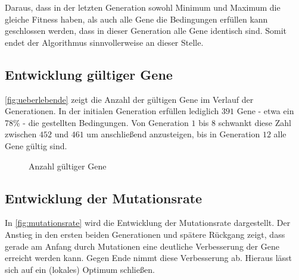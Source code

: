 Daraus, dass in der letzten Generation sowohl Minimum und Maximum die gleiche Fitness haben,
als auch alle Gene die Bedingungen erfüllen kann geschlossen werden, dass in dieser Generation alle Gene identisch sind.
Somit endet der Algorithmus sinnvollerweise an dieser Stelle.

\subsection{Entwicklung gültiger Gene}

\autoref{fig:ueberlebende} zeigt die Anzahl der gültigen Gene im Verlauf der Generationen.
In der initialen Generation erfüllen lediglich $391$ Gene - etwa ein 78\% - die gestellten Bedingungen.
Von Generation $1$ bis $8$ schwankt diese Zahl zwischen $452$ und $461$ um anschließend anzusteigen,
 bis in Generation $12$ alle Gene gültig sind.

\begin{figure}[ht]
    \centering
	\caption{Anzahl gültiger Gene}
	\label{fig:ueberlebende}
\end{figure}

\newpage
\subsection{Entwicklung der Mutationsrate}

In \autoref{fig:mutationsrate} wird die Entwicklung der Mutationsrate dargestellt.
Der Anstieg in den ersten beiden Generationen und spätere Rückgang zeigt,
dass gerade am Anfang durch Mutationen eine deutliche Verbesserung der Gene erreicht werden kann.
Gegen Ende nimmt diese Verbesserung ab. Hieraus lässt sich auf ein (lokales) Optimum schließen.

